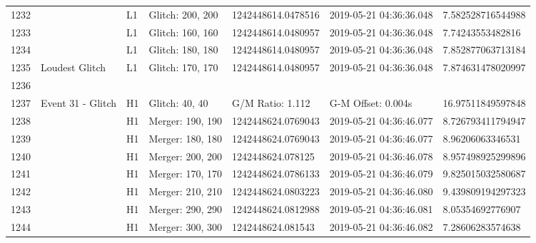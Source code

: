 \begin{longtable}{lllllll}
1232 &                                                    &       L1 &  Glitch: 200, 200 &  1242448614.0478516 &  2019-05-21 04:36:36.048 &   7.582528716544988 \\
1233 &                                                    &       L1 &  Glitch: 160, 160 &  1242448614.0480957 &  2019-05-21 04:36:36.048 &    7.74243553482816 \\
1234 &                                                    &       L1 &  Glitch: 180, 180 &  1242448614.0480957 &  2019-05-21 04:36:36.048 &   7.852877063713184 \\
1235 &                                     Loudest Glitch &       L1 &  Glitch: 170, 170 &  1242448614.0480957 &  2019-05-21 04:36:36.048 &   7.874631478020997 \\
1236 &                                                    &          &                   &                     &                          &                     \\
1237 &                                  Event 31 - Glitch &       H1 &    Glitch: 40, 40 &    G/M Ratio: 1.112 &       G-M Offset: 0.004s &   16.97511849597848 \\
1238 &                                                    &       H1 &  Merger: 190, 190 &  1242448624.0769043 &  2019-05-21 04:36:46.077 &   8.726793411794947 \\
1239 &                                                    &       H1 &  Merger: 180, 180 &  1242448624.0769043 &  2019-05-21 04:36:46.077 &    8.96206063346531 \\
1240 &                                                    &       H1 &  Merger: 200, 200 &   1242448624.078125 &  2019-05-21 04:36:46.078 &   8.957498925299896 \\
1241 &                                                    &       H1 &  Merger: 170, 170 &  1242448624.0786133 &  2019-05-21 04:36:46.079 &   9.825015032580687 \\
1242 &                                                    &       H1 &  Merger: 210, 210 &  1242448624.0803223 &  2019-05-21 04:36:46.080 &   9.439809194297323 \\
1243 &                                                    &       H1 &  Merger: 290, 290 &  1242448624.0812988 &  2019-05-21 04:36:46.081 &    8.05354692776907 \\
1244 &                                                    &       H1 &  Merger: 300, 300 &   1242448624.081543 &  2019-05-21 04:36:46.082 &    7.28606283574638 \\

\end{longtable}
